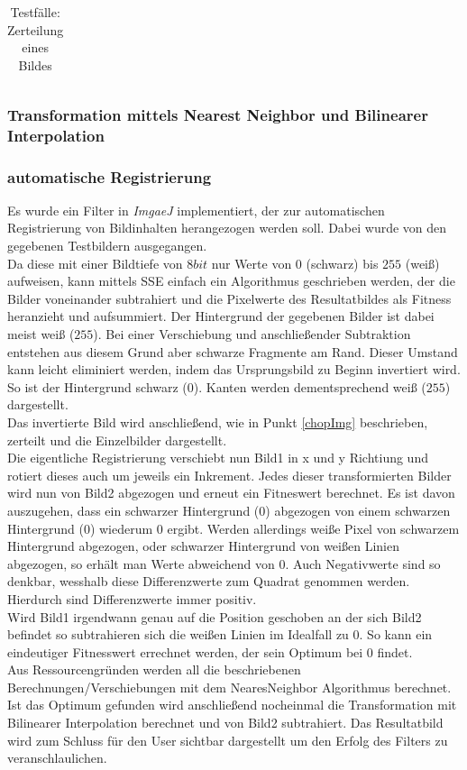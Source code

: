 \documentclass[12pt,german]{article}
\begin{document}
\begin{table}[H]
\begin{tabular}{| c | c | c |}
  \end{tabular}
  \caption{Testfälle: Zerteilung eines Bildes}
  \label{tab:chopInHalfTest}
\end{table}

\subsubsection{Transformation mittels Nearest Neighbor und Bilinearer Interpolation}

\subsubsection{automatische Registrierung}
Es wurde ein Filter in \textit{ImgaeJ} implementiert, der zur automatischen Registrierung von Bildinhalten herangezogen werden soll. Dabei wurde von den gegebenen Testbildern ausgegangen. \\
Da diese mit einer Bildtiefe von $8 bit$ nur Werte von $0$ (schwarz) bis $255$ (weiß) aufweisen, kann mittels SSE einfach ein Algorithmus geschrieben werden, der die Bilder voneinander subtrahiert und die Pixelwerte des Resultatbildes als Fitness heranzieht und aufsummiert. Der Hintergrund der gegebenen Bilder ist dabei meist weiß ($255$). Bei einer Verschiebung und anschließender Subtraktion entstehen aus diesem Grund aber schwarze Fragmente am Rand. Dieser Umstand kann leicht eliminiert werden, indem das Ursprungsbild zu Beginn invertiert wird. So ist der Hintergrund schwarz ($0$). Kanten werden dementsprechend weiß ($255$) dargestellt. \\
Das invertierte Bild wird anschließend, wie in Punkt \ref{chopImg} beschrieben, zerteilt und die Einzelbilder dargestellt. \\
Die eigentliche Registrierung verschiebt nun Bild1 in x und y Richtiung und rotiert dieses auch um jeweils ein Inkrement. Jedes dieser transformierten Bilder wird nun von Bild2 abgezogen und erneut ein Fitneswert berechnet. Es ist davon auszugehen, dass ein schwarzer Hintergrund ($0$) abgezogen von einem schwarzen Hintergrund ($0$) wiederum $0$ ergibt. Werden allerdings weiße Pixel von schwarzem Hintergrund abgezogen, oder schwarzer Hintergrund von weißen Linien abgezogen, so erhält man Werte abweichend von $0$. Auch Negativwerte sind so denkbar, wesshalb diese Differenzwerte zum Quadrat genommen werden. Hierdurch sind Differenzwerte immer positiv.\\
Wird Bild1 irgendwann genau auf die Position geschoben an der sich Bild2 befindet so subtrahieren sich die weißen Linien im Idealfall zu $0$. So kann ein eindeutiger Fitnesswert errechnet werden, der sein Optimum bei $0$ findet.\\
Aus Ressourcengründen werden all die beschriebenen Berechnungen/Verschiebungen mit dem NearesNeighbor Algorithmus berechnet. Ist das Optimum gefunden wird anschließend nocheinmal die Transformation mit Bilinearer Interpolation berechnet und von Bild2 subtrahiert. Das Resultatbild wird zum Schluss für den User sichtbar dargestellt um den Erfolg des Filters zu veranschlaulichen. \\
\end{document}
